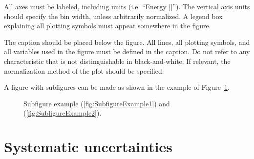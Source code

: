 \documentclass[11pt,a4paper]{atlasnote}
\begin{document}
All axes must be labeled, including units (i.e. ``Energy [\gev]'').
The vertical axis units should specify the bin width, unless
arbitrarily normalized. A legend box explaining all plotting symbols
must appear somewhere in the figure.

The caption should be placed below the figure.  All lines, all
plotting symbols, and all variables used in the figure must be defined
in the caption. Do not refer to any characteristic that is not
distinguishable in black-and-white.  If relevant, the normalization
method of the plot should be specified.

A figure with subfigures can be made as shown in the example of
Figure~\ref{fig:subfigexample}.

\begin{figure}
  \centering
  \caption{Subfigure example (\ref{fig:SubfigureExample1}) and
    (\ref{fig:SubfigureExample2}).}
  \label{fig:subfigexample}
\end{figure}

%
%
\section{Systematic uncertainties}
\end{document}
